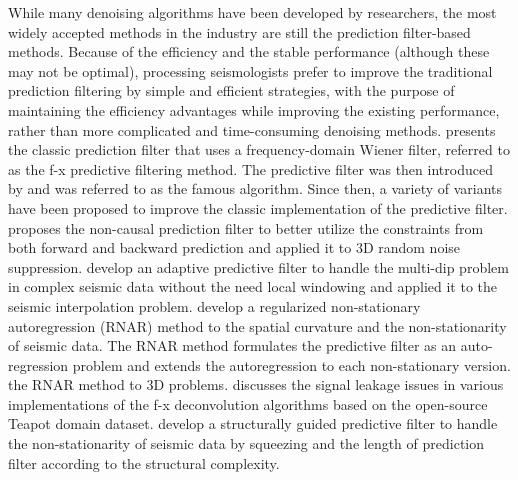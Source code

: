 While many denoising algorithms have been developed by researchers, the most widely accepted methods in the industry are still the prediction filter-based methods. Because of the efficiency and the stable performance (although these may not be optimal), processing seismologists prefer to improve the traditional prediction filtering by simple and efficient strategies, with the purpose of maintaining the efficiency advantages while improving the existing performance, rather than  more complicated and time-consuming denoising methods. \cite{canales1984} presents the classic prediction filter that uses a frequency-domain Wiener filter, referred to as the f-x predictive filtering method. The predictive filter was then introduced by \cite{gulunay1986fxdecon} and was referred to as the famous  algorithm. Since then, a variety of variants have been proposed to improve the classic implementation of the predictive filter. \cite{fxydecon} proposes the non-causal prediction filter to better utilize the constraints from both forward and backward prediction and applied it to 3D random noise suppression. \cite{naghizadeh2009f} develop an adaptive predictive filter to handle the multi-dip problem in complex seismic data without the need  local windowing and applied it to the seismic interpolation problem.  \cite{guochang2012} develop a regularized non-stationary autoregression (RNAR) method to  the spatial curvature and the non-stationarity of seismic data. The RNAR method formulates the predictive filter as an auto-regression problem and extends the autoregression to each non-stationary version. \cite{guochang2013}  the RNAR method to 3D problems.  \cite{fx2017} discusses the signal leakage issues in various implementations of the f-x deconvolution algorithms based on the open-source Teapot domain dataset.  \cite{fuchao2020} develop a structurally guided predictive filter to handle the non-stationarity of seismic data by squeezing and  the length of prediction filter according to the structural complexity. 
 

